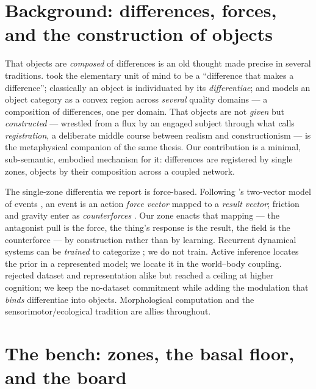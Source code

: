 \documentclass[11pt]{article}
\begin{document}
\section{Background: differences, forces, and the construction of objects}

That objects are \emph{composed} of differences is an old thought made precise in
several traditions. \citet{Bateson1972} took the elementary unit of mind to be a
``difference that makes a difference''; classically an object is individuated by
its \emph{differentiae}; and \citet{Gardenfors2014} models an object category as a
convex region across \emph{several} quality domains --- a composition of
differences, one per domain. That objects are not \emph{given} but
\emph{constructed} --- wrestled from a flux by an engaged subject through what
\citet{Smith1996} calls \emph{registration}, a deliberate middle course between
realism and constructionism --- is the metaphysical companion of the same thesis.
Our contribution is a minimal, sub-semantic, embodied mechanism for it:
differences are registered by single zones, objects by their composition across a
coupled network.

The single-zone differentia we report is force-based. Following
\citeauthor{Gardenfors2020}'s two-vector model of events
\citep{Gardenfors2020,GardenforsWarglien2012}, an event is an action \emph{force
vector} mapped to a \emph{result vector}; friction and gravity enter as
\emph{counterforces} \citep{Talmy1988,Wolff2007}. Our zone enacts that mapping ---
the antagonist pull is the force, the thing's response is the result, the field is
the counterforce --- by construction rather than by learning. Recurrent dynamical
systems can be \emph{trained} to categorize \citep{Beer2003,Maass2002}; we do not
train. Active inference \citep{ParrPezzuloFriston2022,PezzuloCisek2016} locates the
prior in a represented model; we locate it in the world--body coupling.
\citet{Brooks1991} rejected dataset and representation alike but reached a ceiling
at higher cognition; we keep the no-dataset commitment while adding the modulation
that \emph{binds} differentiae into objects. Morphological computation
\citep{PfeiferBongard2006} and the sensorimotor/ecological tradition
\citep{ORegan2001,Gibson1979} are allies throughout.

\section{The bench: zones, the basal floor, and the board}
\end{document}
